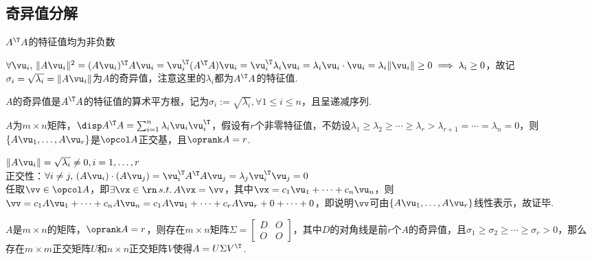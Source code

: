 \subsection{奇异值分解}%
\begin{theorem}
$A^\T A$的特征值均为非负数
\end{theorem}
\begin{analysis}
$\forall\vu_i,\,\|A\vu_i\|^2=(A\vu_i)^\T A\vu_i=\vu_i^\T (A^\T A)\vu_i=\vu_i^\T \lambda_i\vu_i=\lambda_i\vu_i\cdot\vu_i=\lambda_i\|\vu_i\|\geq 0\implies \lambda_i\geq 0$，故记$\sigma_i=\sqrt{\lambda_i}=\|A\vu_i\|$为$A$的奇异值，注意这里的$\lambda_i$都为$A^\T A$的特征值.
\end{analysis}
\begin{definition}[奇异值]
$A$的奇异值是$A^\T A$的特征值的算术平方根，记为$\sigma_i:=\sqrt{\lambda_i},\forall 1\leq i\leq n$，且呈递减序列.
\end{definition}
\begin{theorem}
$A$为$m\times n$矩阵，$\disp A^\T A=\sum_{i=1}^n\lambda_i\vu_i\vu_i^\T $，假设有$r$个非零特征值，不妨设$\lambda_1\geq\lambda_2\geq\cdots\geq\lambda_r>\lambda_{r+1}=\cdots=\lambda_n=0$，则$\{A\vu_1,\dots,A\vu_r\}$是$\opcol A$正交基，且$\oprank A=r$.
\end{theorem}
\begin{analysis}
$\|A\vu_i\|=\sqrt{\lambda_i}\ne 0,i=1,\dots,r$\\
正交性：$\forall i\ne j,\,(A\vu_i)\cdot(A\vu_j)=\vu_i^\T A^\T A\vu_j=\lambda_j\vu_i^\T \vu_j=0$\\
任取$\vv\in\opcol A$，即$\exists\vx\in\rn\,s.t.\,A\vx=\vv$，其中$\vx=c_1\vu_1+\cdots+c_n\vu_n$，则$\vv=c_1A\vu_1+\cdots+c_nA\vu_n=c_1A\vu_1+\cdots+c_rA\vu_r+0+\cdots+0$，即说明$\vv$可由$\{A\vu_1,\dots,A\vu_r\}$线性表示，故证毕.
\end{analysis}
\begin{theorem}
$A$是$m\times n$的矩阵，$\oprank A=r$，则存在$m\times n$矩阵$\Sigma=\begin{bmatrix}D&O\\O&O\end{bmatrix}$，其中$D$的对角线是前$r$个$A$的奇异值，且$\sigma_1\geq\sigma_2\geq\cdots\geq\sigma_r>0$，那么存在$m\times m$正交矩阵$U$和$n\times n$正交矩阵$V$使得$A=U\Sigma V^\T $.
\end{theorem}
